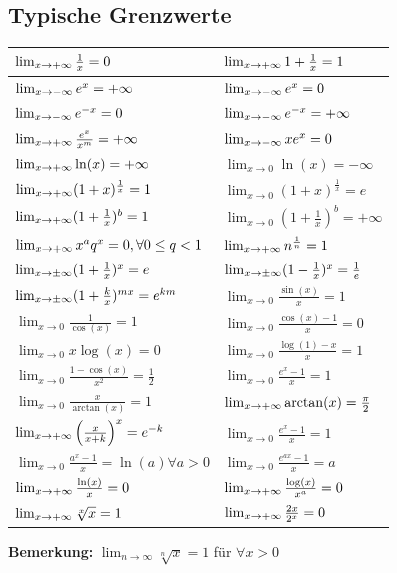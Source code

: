 \documentclass[a4paper,8pt]{extarticle}
\newenvironment{bemerkung}{
   \noindent \textbf{Bemerkung:  }}{}
\begin{document}
\subsection{Typische Grenzwerte}
\begin{center}
  \begin{tabular}[]{|l|l|}
    \hline
    $\lim_{x\to +\infty} \frac{1}{x} = 0$ & $\lim_{x\to +\infty} 1 + \frac{1}{x} = 1$ \\
    \hline
    $\lim_{x\to -\infty} e^x = +\infty$ & $\lim_{x\to -\infty} e^x = 0$ \\
    \hline
    $\lim_{x\to -\infty} e^{-x} = 0$ & $\lim_{x\to -\infty} e^{-x} = +\infty$ \\
    \hline
    $\lim_{x\to +\infty} \frac{e^x}{x^m} = +\infty$ & $\lim_{x\to -\infty} x e^x = 0$ \\
    \hline
    $\lim_{x\to +\infty} \ln(x) = +\infty$ & $\lim_{x \to 0} \ln(x) = -\infty$ \\
    \hline
    $\lim_{x\to +\infty} (1 + x)^{\frac{1}{x}} = 1$ & $\lim_{x \to 0} (1 + x)^{\frac{1}{x}} = e$ \\
    \hline
    $\lim_{x\to +\infty} (1 + \frac{1}{x})^b = 1$ &  $\lim_{x \to 0} (1 + \frac{1}{x})^b = +\infty$\\
    \hline
    $\lim_{x\to +\infty} x^aq^x = 0, \forall 0 \leq q < 1$ & $\lim_{x\to +\infty} n^{\frac{1}{n}} = 1$\\
    \hline
    $\lim_{x\to \pm \infty} (1 + \frac{1}{x})^x = e$ & $\lim_{x\to \pm \infty} (1 - \frac{1}{x})^x = \frac{1}{e}$ \\
    \hline
    $\lim_{x\to \pm \infty} (1 + \frac{k}{x})^{mx} = e^{km}$ & $\lim_{x \to 0} \frac{\sin(x)}{x} = 1$ \\
    \hline
    $\lim_{x \to 0} \frac{1}{\cos(x)} = 1$ & $\lim_{x \to 0} \frac{\cos(x) - 1}{x} = 0$ \\
    \hline
    $\lim_{x \to 0} x\log(x) = 0$ & $\lim_{x \to 0} \frac{\log(1) - x}{x} = 1$ \\
    \hline
    $\lim_{x \to 0} \frac{1 - \cos(x)}{x^2} = \frac{1}{2}$ & $\lim_{x \to 0} \frac{e^x - 1}{x} = 1$ \\
    \hline
    $\lim_{x \to 0} \frac{x}{\arctan(x)} = 1$ & $\lim_{x\to +\infty} \arctan(x) = \frac{\pi}{2}$ \\
    \hline
    $\lim_{x\to +\infty} \left( \frac{x}{x+k}  \right) ^x = e^{-k}$ & $\lim_{x \to 0} \frac{e^x - 1}{x} = 1$ \\
    \hline
    $\lim_{x \to 0} \frac{a^x - 1}{x} = \ln(a)  \forall a > 0$ & $\lim_{x \to 0} \frac{e^{ax}-1}{x} = a$ \\
    \hline
    $\lim_{x\to +\infty} \frac{\ln(x)}{x} = 0$ & $\lim_{x\to +\infty} \frac{\log(x)}{x^a} = 0$ \\
    \hline
    $\lim_{x\to +\infty} \sqrt[x]{x} = 1$ & $\lim_{x\to +\infty} \frac{2x}{2^x} = 0$ \\
    \hline
  \end{tabular}
\end{center}
\begin{bemerkung}
  $\lim _{n \rightarrow \infty} \sqrt[n]{x}=1$ für $\forall x>0$
\end{bemerkung}
\end{document}
